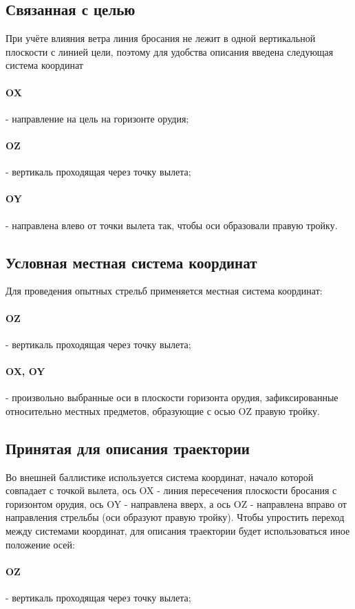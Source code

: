 \subsection{Связанная с целью}
При учёте влияния ветра линия бросания не лежит в одной вертикальной плоскости с линией цели, поэтому для удобства описания введена следующая система координат
\paragraph{OX} - направление на цель на горизонте орудия;
\paragraph{OZ} - вертикаль проходящая через точку вылета;
\paragraph{OY} - направлена влево от точки вылета так, чтобы оси образовали правую тройку.

\subsection{Условная местная система координат}
Для проведения опытных стрельб применяется местная система координат:
\paragraph{OZ} - вертикаль проходящая через точку вылета;
\paragraph{OX, OY} - произвольно выбранные оси в плоскости горизонта орудия, зафиксированные относительно местных предметов, образующие с осью OZ правую тройку.

\subsection{Принятая для описания траектории}
Во внешней баллистике используется система координат, начало которой совпадает с точкой вылета, ось OX - линия пересечения плоскости бросания с горизонтом орудия, ось OY - направлена вверх, а ось OZ - направлена вправо от направления стрельбы (оси образуют правую тройку).
Чтобы упростить переход между системами координат, для описания траектории будет использоваться иное положение осей:
\paragraph{OZ} - вертикаль проходящая через точку вылета;
